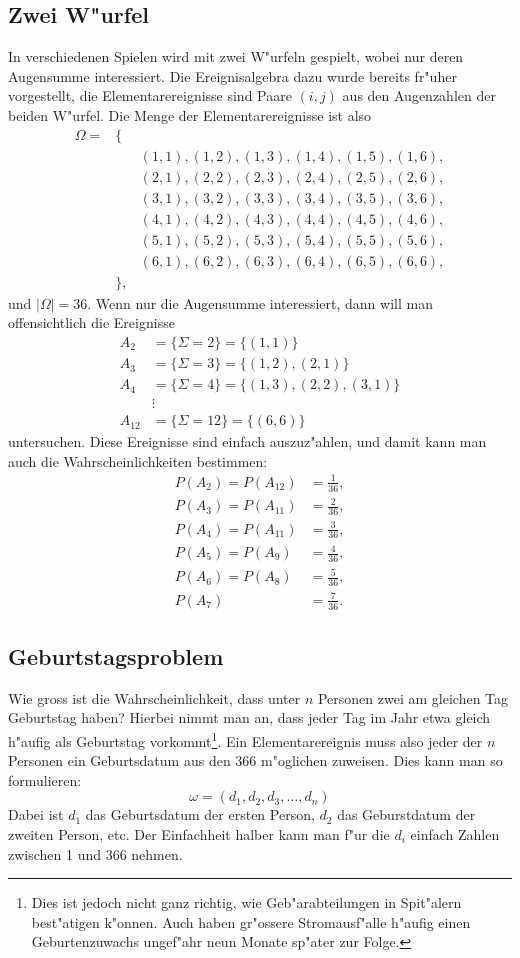 \subsection{Zwei W"urfel}
In verschiedenen Spielen wird mit zwei W"urfeln gespielt, wobei nur
deren Augensumme interessiert.
Die Ereignisalgebra dazu wurde bereits
fr"uher vorgestellt, die Elementarereignisse sind Paare $(i,j)$ aus
den Augenzahlen der beiden W"urfel.
Die Menge der Elementarereignisse
ist also
\begin{eqnarray*}
\Omega=&\{&\\
&&(1,1),(1,2),(1,3),(1,4),(1,5),(1,6),\\
&&(2,1),(2,2),(2,3),(2,4),(2,5),(2,6),\\
&&(3,1),(3,2),(3,3),(3,4),(3,5),(3,6),\\
&&(4,1),(4,2),(4,3),(4,4),(4,5),(4,6),\\
&&(5,1),(5,2),(5,3),(5,4),(5,5),(5,6),\\
&&(6,1),(6,2),(6,3),(6,4),(6,5),(6,6),\\
&\},&
\end{eqnarray*}
und $|\Omega|=36$.
Wenn nur die Augensumme interessiert, dann will
man offensichtlich die Ereignisse
\begin{align*}
A_2&=\{\Sigma=2\}=\{(1,1)\}\\
A_3&=\{\Sigma=3\}=\{(1,2),(2,1)\}\\
A_4&=\{\Sigma=4\}=\{(1,3),(2,2),(3,1)\}\\
&\vdots\\
A_{12}&=\{\Sigma=12\}=\{(6,6)\}
\end{align*}
untersuchen.
Diese Ereignisse sind einfach auszuz"ahlen, und damit kann man auch
die Wahrscheinlichkeiten bestimmen:
\begin{align*}
P(A_2)=P(A_{12})&=\frac{1}{36},\\
P(A_3)=P(A_{11})&=\frac{2}{36},\\
P(A_4)=P(A_{11})&=\frac{3}{36},\\
P(A_5)=P(A_9)&=\frac{4}{36},\\
P(A_6)=P(A_8)&=\frac{5}{36},\\
P(A_7)&=\frac{7}{36}.
\end{align*}

\subsection{Geburtstagsproblem}
Wie gross ist die Wahrscheinlichkeit, dass unter $n$ Personen zwei
am gleichen Tag Geburtstag haben? Hierbei nimmt man an, dass
jeder Tag im Jahr etwa gleich h"aufig als Geburtstag
vorkommt\footnote{Dies ist
jedoch nicht ganz richtig, wie Geb"arabteilungen in Spit"alern
best"atigen k"onnen.
Auch haben gr"ossere Stromausf"alle h"aufig
einen Geburtenzuwachs ungef"ahr neun Monate sp"ater zur Folge.}.
Ein Elementarereignis muss also jeder der $n$ Personen ein
Geburtsdatum aus den $366$ m"oglichen zuweisen.
Dies kann man so
formulieren:
\[
\omega=(d_1, d_2, d_3,\dots,d_n)
\]
Dabei ist $d_1$ das Geburtsdatum der ersten Person, $d_2$ das
Geburstdatum der zweiten Person, etc.
Der Einfachheit halber kann
man f"ur die $d_i$ einfach Zahlen zwischen 1 und 366 nehmen.

